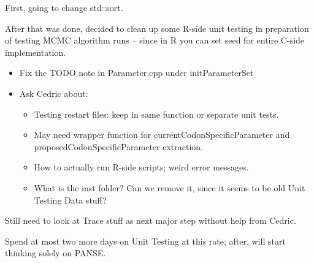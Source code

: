 \documentclass[12pt,hyperref]{labbook}
\newcommand{\sep}{\discretionary{}{}{}} %
\begin{document}
First, going to change std::sort.

After that was done, decided to clean up some R-side unit testing in preparation of testing
MCMC algorithm runs -- since in R you can set seed for entire C-side implementation.

\begin{itemize}
    \item Fix the TODO note in Parameter.cpp under initParameterSet 
    \item Ask Cedric about:
    \begin{itemize}
        \item Testing restart files: keep in same function or separate unit tests.
        \item May need wrapper function for current\sep Codon\sep Specific\sep Parameter 
        and proposed\sep Codon\sep Specific\sep Parameter extraction. 
        \item How to actually run R-side scripts; weird error messages.
        \item What is the inst folder? Can we remove it, since it seems to be old Unit Testing Data stuff?
    \end{itemize}
\end{itemize}

Still need to look at Trace stuff as next major step without help from Cedric.

Spend at most two more days on Unit Testing at this rate; after, will start thinking solely
on PANSE.
\end{document}
